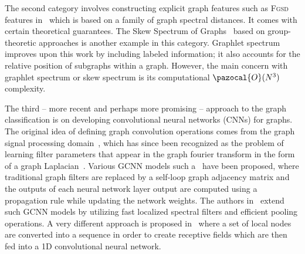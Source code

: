 \documentclass{article}
\newcommand{\BigO}{\pazocal{O}}
\begin{document}

The second category involves constructing explicit graph features such as  \textsc{Fgsd} features in~\cite{verma2017hunt} which is based on a family of graph spectral distances. It comes with certain theoretical guarantees. The Skew Spectrum of Graphs~\cite{kondor2008skew} based on group-theoretic approaches  is another  example in this category. Graphlet spectrum~\cite{kondor2009graphlet}  improves upon this work by including   labeled information; it also accounts for the relative position of subgraphs  within a graph. However, the main concern with   graphlet spectrum or  skew spectrum is its computational $\BigO(N^{3})$ complexity. 


The third -- more recent and perhaps more promising -- approach to the graph classification is on developing convolutional neural networks (CNNs) for graphs.  The original idea of defining graph convolution operations   comes from the graph signal processing domain~\cite{shuman2013emerging}, which  has since been recognized as the problem of learning   filter parameters that appear in the graph fourier transform in the form of a   graph Laplacian~\cite{bruna2013spectral,henaff2015deep}.  Various GCNN models such a~\cite{kipf2016semi,atwood2016diffusion, duvenaud2015convolutional} have been proposed, 
  where traditional graph filters are replaced by a self-loop graph adjacency matrix and the outputs of  each neural network layer output are computed using a propagation rule while updating the network weights.  The authors in~\cite{defferrard2016convolutional} extend such GCNN models by utilizing fast localized spectral filters and efficient  pooling operations. A very different approach is  proposed in~\cite{niepert2016learning}  where a set of  local nodes are converted into a  sequence in order to  create receptive fields which are then   fed into a 1D convolutional neural network.
\end{document}
